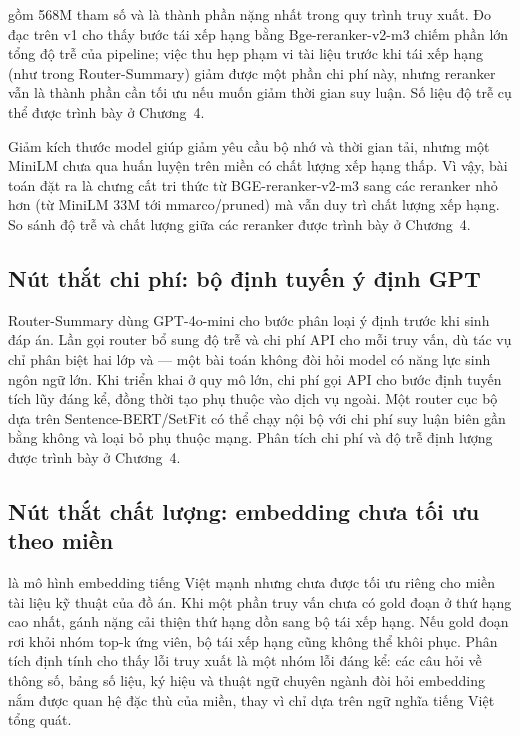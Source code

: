 \documentclass[../DoAn.tex]{subfiles}
\begin{document}
 gồm 568M tham số và là thành phần nặng nhất trong quy trình truy xuất. Đo đạc trên v1 cho thấy bước tái xếp hạng bằng Bge-reranker-v2-m3 chiếm phần lớn tổng độ trễ của pipeline; việc thu hẹp phạm vi tài liệu trước khi tái xếp hạng (như trong Router-Summary) giảm được một phần chi phí này, nhưng reranker vẫn là thành phần cần tối ưu nếu muốn giảm thời gian suy luận. Số liệu độ trễ cụ thể được trình bày ở Chương~4.

Giảm kích thước model giúp giảm yêu cầu bộ nhớ và thời gian tải, nhưng một MiniLM chưa qua huấn luyện trên miền có chất lượng xếp hạng thấp. Vì vậy, bài toán đặt ra là chưng cất tri thức từ BGE-reranker-v2-m3 sang các reranker nhỏ hơn (từ MiniLM 33M tới mmarco/pruned) mà vẫn duy trì chất lượng xếp hạng. So sánh độ trễ và chất lượng giữa các reranker được trình bày ở Chương~4.

\subsection{Nút thắt chi phí: bộ định tuyến ý định GPT}
\label{subsection:3.5.2}

Router-Summary dùng GPT-4o-mini cho bước phân loại ý định trước khi sinh đáp án. Lần gọi router bổ sung độ trễ và chi phí API cho mỗi truy vấn, dù tác vụ chỉ phân biệt hai lớp  và  --- một bài toán không đòi hỏi model có năng lực sinh ngôn ngữ lớn. Khi triển khai ở quy mô lớn, chi phí gọi API cho bước định tuyến tích lũy đáng kể, đồng thời tạo phụ thuộc vào dịch vụ ngoài. Một router cục bộ dựa trên Sentence-BERT/SetFit có thể chạy nội bộ với chi phí suy luận biên gần bằng không và loại bỏ phụ thuộc mạng. Phân tích chi phí và độ trễ định lượng được trình bày ở Chương~4.

\subsection{Nút thắt chất lượng: embedding chưa tối ưu theo miền}
\label{subsection:3.5.3}

 là mô hình embedding tiếng Việt mạnh nhưng chưa được tối ưu riêng cho miền tài liệu kỹ thuật của đồ án. Khi một phần truy vấn chưa có gold đoạn ở thứ hạng cao nhất, gánh nặng cải thiện thứ hạng dồn sang bộ tái xếp hạng. Nếu gold đoạn rơi khỏi nhóm top-k ứng viên, bộ tái xếp hạng cũng không thể khôi phục. Phân tích định tính cho thấy lỗi truy xuất là một nhóm lỗi đáng kể: các câu hỏi về thông số, bảng số liệu, ký hiệu và thuật ngữ chuyên ngành đòi hỏi embedding nắm được quan hệ đặc thù của miền, thay vì chỉ dựa trên ngữ nghĩa tiếng Việt tổng quát.
\end{document}
